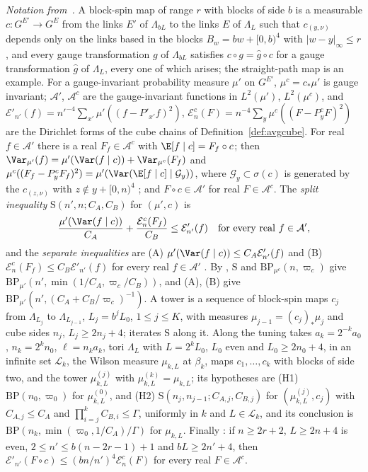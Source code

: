 \emph{Notation from~\cite{BBLR26}.} A block-spin map of range $r$ with
blocks of side $b$ is a measurable $c:G^{E'}\to G^E$ from the links $E'$ of
$\Lambda_{bL}$ to the links $E$ of $\Lambda_L$ such that $c_{(y,\nu)}$
depends only on the links based in the blocks $B_w=bw+[0,b)^4$ with
$\lvert w-y\rvert_\infty\le r$, and every gauge transformation $g$ of
$\Lambda_{bL}$ satisfies $c\circ g=\hat g\circ c$ for a gauge transformation
$\hat g$ of $\Lambda_L$, every one of which arises; the straight-path map
is an example. For a gauge-invariant probability measure $\mu'$ on
$G^{E'}$, $\mu^c=c_*\mu'$ is gauge invariant; $\mathcal A'$, $\mathcal A^c$
are the gauge-invariant functions in $L^2(\mu')$, $L^2(\mu^c)$, and
$\mathcal E'_{n'}(f)=n'^{-4}\sum_{x'}\mu'((f-P'_{x'}f)^2)$, $\mathcal
E^c_n(F)=n^{-4}\sum_y\mu^c((F-P^c_yF)^2)$ are the Dirichlet forms of the
cube chains of Definition~\ref{def:avgcube}. For real $f\in\mathcal A'$
there is a real $F_f\in\mathcal A^c$ with $\E[f\mid c]=F_f\circ c$; then
$\Var_{\mu'}(f)=\mu'(\Var(f\mid c))+\Var_{\mu^c}(F_f)$ and
$\mu^c((F_f-P^c_yF_f)^2)=\mu'(\Var(\E[f\mid c]\mid\mathcal G_y))$, where
$\mathcal G_y\subset\sigma(c)$ is generated by the $c_{(z,\nu)}$ with
$z\notin y+[0,n)^4$ \cite[Lemma~98]{BBLR26}; and $F\circ c\in\mathcal A'$
for real $F\in\mathcal A^c$. The \emph{split inequality}
$\mathrm S(n',n;C_A,C_B)$ for $(\mu',c)$ is
\[
\frac{\mu'(\Var(f\mid c))}{C_A}+\frac{\mathcal E^c_n(F_f)}{C_B}\le
\mathcal E'_{n'}(f)\quad\text{for every real }f\in\mathcal A',
\]
and the \emph{separate inequalities} are \textup{(A)}
$\mu'(\Var(f\mid c))\le C_A\mathcal E'_{n'}(f)$ and \textup{(B)} $\mathcal
E^c_n(F_f)\le C_B\mathcal E'_{n'}(f)$ for every real $f\in\mathcal A'$
\cite[Definition~99]{BBLR26}. By \cite[Theorem~100]{BBLR26}, $\mathrm S$
and $\mathrm{BP}_{\mu^c}(n,\varpi_c)$ give $\mathrm{BP}_{\mu'}(n',\min(1/
C_A,\varpi_c/C_B))$, and (A), (B) give $\mathrm{BP}_{\mu'}(n',(C_A+C_B/
\varpi_c)^{-1})$. A tower is a sequence of block-spin maps $c_j$ from
$\Lambda_{L_j}$ to $\Lambda_{L_{j-1}}$, $L_j=b^jL_0$, $1\le j\le K$, with
measures $\mu_{j-1}=(c_j)_*\mu_j$ and cube sides $n_j$, $L_j\ge2n_j+4$;
\cite[Theorem~101]{BBLR26} iterates $\mathrm S$ along it. Along the tuning
\cite[Corollary~102]{BBLR26} takes $a_k=2^{-k}a_0$, $n_k=2^kn_0$,
$\ell=n_ka_k$, tori $\Lambda_L$ with $L=2^kL_0$, $L_0$ even and $L_0\ge
2n_0+4$, in an infinite set $\mathcal L_k$, the Wilson measure $\mu_{k,L}$
at $\beta_k$, maps $c_1,\dots,c_k$ with blocks of side two, and the tower
$\mu^{(j)}_{k,L}$ with $\mu^{(k)}_{k,L}=\mu_{k,L}$; its hypotheses are
\textup{(H1)} $\mathrm{BP}(n_0,\varpi_0)$ for $\mu^{(0)}_{k,L}$, and
\textup{(H2)} $\mathrm S(n_j,n_{j-1};C_{A,j},C_{B,j})$ for
$(\mu^{(j)}_{k,L},c_j)$ with $C_{A,j}\le C_A$ and $\prod_{i=j}^kC_{B,i}\le
\Gamma$, uniformly in $k$ and $L\in\mathcal L_k$, and its conclusion is
$\mathrm{BP}(n_k,\min(\varpi_0,1/C_A)/\Gamma)$ for $\mu_{k,L}$. Finally
\cite[Theorem~94(i)]{BBLR26}: if $n\ge2r+2$, $L\ge2n+4$ is even, $2\le n'\le
b(n-2r-1)+1$ and $bL\ge2n'+4$, then $\mathcal E'_{n'}(F\circ c)\le(bn/n')^4
\mathcal E^c_n(F)$ for every real $F\in\mathcal A^c$.

